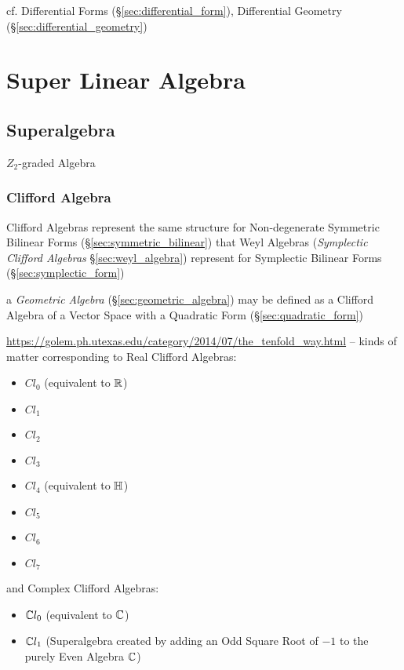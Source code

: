 cf. Differential Forms (\S\ref{sec:differential_form}), Differential Geometry
(\S\ref{sec:differential_geometry})



\section{Super Linear Algebra}\label{sec:super_linear_algebra}

\subsection{Superalgebra}\label{sec:superalgebra}

$Z_2$-graded Algebra



\subsubsection{Clifford Algebra}\label{sec:clifford_algebra}

Clifford Algebras represent the same structure for Non-degenerate Symmetric
Bilinear Forms (\S\ref{sec:symmetric_bilinear}) that Weyl Algebras
(\emph{Symplectic Clifford Algebras} \S\ref{sec:weyl_algebra}) represent for
Symplectic Bilinear Forms (\S\ref{sec:symplectic_form})

\fist a \emph{Geometric Algebra} (\S\ref{sec:geometric_algebra}) may be defined
as a Clifford Algebra of a Vector Space with a Quadratic Form
(\S\ref{sec:quadratic_form})

\url{https://golem.ph.utexas.edu/category/2014/07/the_tenfold_way.html} -- kinds
of matter corresponding to Real Clifford Algebras:
\begin{itemize}
\item $Cl_0$ (equivalent to $\mathbb{R}$)
\item $Cl_1$
\item $Cl_2$
\item $Cl_3$
\item $Cl_4$ (equivalent to $\mathbb{H}$)
\item $Cl_5$
\item $Cl_6$
\item $Cl_7$
\end{itemize}
and Complex Clifford Algebras:
\begin{itemize}
\item $\mathbb{C}{l}_0$ (equivalent to $\mathbb{C}$)
\item $\mathbb{C}{l}_1$ (Superalgebra created by adding an Odd Square Root of $-1$
  to the purely Even Algebra $\mathbb{C}$)
\end{itemize}

